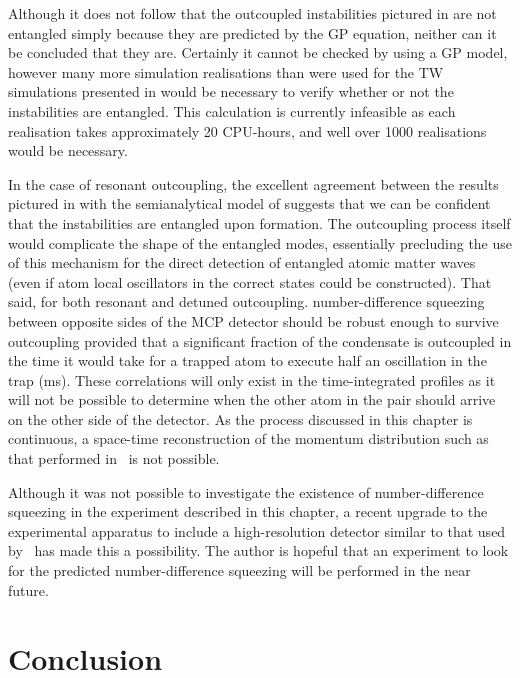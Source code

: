 Although it does not follow that the outcoupled instabilities pictured in  are not entangled simply because they are predicted by the GP equation, neither can it be concluded that they are.  Certainly it cannot be checked by using a GP model, however many more simulation realisations than were used for the TW simulations presented in  would be necessary to verify whether or not the instabilities are entangled.  This calculation is currently infeasible as each realisation takes approximately 20 CPU-hours, and well over 1000 realisations would be necessary.  

In the case of resonant outcoupling, the excellent agreement between the results pictured in  with the semianalytical model of  suggests that we can be confident that the instabilities are entangled upon formation.  The outcoupling process itself would complicate the shape of the entangled modes, essentially precluding the use of this mechanism for the direct detection of entangled atomic matter waves (even if atom local oscillators in the correct states could be constructed).  That said, for both resonant and detuned outcoupling. number-difference squeezing between opposite sides of the MCP detector should be robust enough to survive outcoupling provided that a significant fraction of the condensate is outcoupled in the time it would take for a trapped atom to execute half an oscillation in the trap (\unit[9]{ms}).  These correlations will only exist in the time-integrated profiles as it will not be possible to determine when the other atom in the pair should arrive on the other side of the detector.  As the process discussed in this chapter is continuous, a space-time reconstruction of the momentum distribution such as that performed in~\citep{Perrin:2007} is not possible.

Although it was not possible to investigate the existence of number-difference squeezing in the experiment described in this chapter, a recent upgrade to the experimental apparatus to include a high-resolution detector similar to that used by~\citet{Perrin:2007} has made this a possibility.  The author is hopeful that an experiment to look for the predicted number-difference squeezing will be performed in the near future.

\section{Conclusion}

